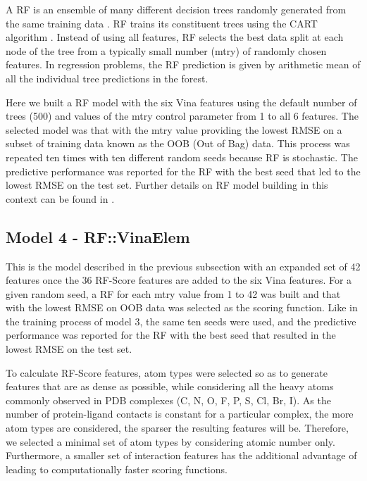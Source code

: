 A RF is an ensemble of many different decision trees randomly generated from the same training data \citep{1309}. RF trains its constituent trees using the CART algorithm \citep{1310}. Instead of using all features, RF selects the best data split at each node of the tree from a typically small number (mtry) of randomly chosen features. In regression problems, the RF prediction is given by arithmetic mean of all the individual tree predictions in the forest.

Here we built a RF model with the six Vina features using the default number of trees (500) and values of the mtry control parameter from 1 to all 6 features. The selected model was that with the mtry value providing the lowest RMSE on a subset of training data known as the OOB (Out of Bag) data. This process was repeated ten times with ten different random seeds because RF is stochastic. The predictive performance was reported for the RF with the best seed that led to the lowest RMSE on the test set. Further details on RF model building in this context can be found in \citep{564}.

\subsection{Model 4 - RF::VinaElem}

This is the model described in the previous subsection with an expanded set of 42 features once the 36 RF-Score features are added to the six Vina features. For a given random seed, a RF for each mtry value from 1 to 42 was built and that with the lowest RMSE on OOB data was selected as the scoring function. Like in the training process of model 3, the same ten seeds were used, and the predictive performance was reported for the RF with the best seed that resulted in the lowest RMSE on the test set.

To calculate RF-Score features, atom types were selected so as to generate features that are as dense as possible, while considering all the heavy atoms commonly observed in PDB complexes (C, N, O, F, P, S, Cl, Br, I). As the number of protein-ligand contacts is constant for a particular complex, the more atom types are considered, the sparser the resulting features will be. Therefore, we selected a minimal set of atom types by considering atomic number only. Furthermore, a smaller set of interaction features has the additional advantage of leading to computationally faster scoring functions.

